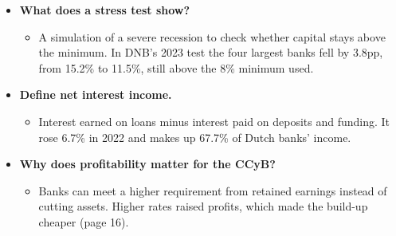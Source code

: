\documentclass[10pt]{article}
\begin{document}
\begin{tcolorbox}[sbox,width=0.495\linewidth,height=14.6cm,nobeforeafter,box align=top,fit basedim=11pt,colframe=nlred!70,colbacktitle=nlred!8,coltitle=nlred,title=LIKELY CHALLENGES · definitions and logic]
\begin{itemize}
\item[\textcolor{navy}{\textbf{Q}}] \textbf{What does a stress test show?}
\begin{itemize}
\item A simulation of a severe recession to check whether capital stays above the minimum. In DNB's 2023 test the four largest banks fell by 3.8pp, from 15.2\% to 11.5\%, still above the 8\% minimum used.
\end{itemize}
\item[\textcolor{navy}{\textbf{Q}}] \textbf{Define net interest income.}
\begin{itemize}
\item Interest earned on loans minus interest paid on deposits and funding. It rose 6.7\% in 2022 and makes up 67.7\% of Dutch banks' income.
\end{itemize}
\item[\textcolor{navy}{\textbf{Q}}] \textbf{Why does profitability matter for the CCyB?}
\begin{itemize}
\item Banks can meet a higher requirement from retained earnings instead of cutting assets. Higher rates raised profits, which made the build-up cheaper (page 16).
\end{itemize}
\end{itemize}
\end{tcolorbox}
\newpage
\end{document}
